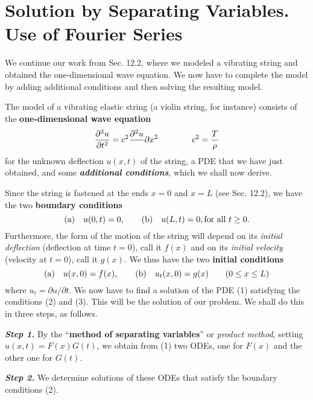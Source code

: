\documentclass[12pt, leqno, oneside]{amsart}
\begin{document}
\section{Solution by Separating Variables.\\
Use of Fourier Series}

We continue our work from Sec. 12.2, where we modeled a vibrating string and 
obtained the one-dimensional wave equation. We now have to complete the model 
by adding additional conditions and then solving the resulting model.

The model of a vibrating elastic string (a violin string, for instance)
consists of the \textbf{one-dimensional wave equation}
\begin{equation}
    \frac{\partial^2{u}}{\partial{t^2}} = c^2\frac{\partial^2{u}}\\
        {\partial{x^2}} \qquad \qquad c^2 = \frac{T}{\rho}
\end{equation}
for the unknown deflection $u(x,t)$ of the string, a PDE that we have just 
obtained, and some \textbf{\emph{additional conditions}}, which we shall now 
derive.

Since the string is fastened at the ends $x=0$ and $x=L$ (see Sec. 12.2), we 
have the two \textbf{boundary conditions}
\begin{equation}
    \text{(a)} \quad u(0,t) = 0, \qquad \text{(b)} \quad u(L,t) = 0, \qquad \\
        \text{for all } t \geq 0.
\end{equation}
Furthermore, the form of the motion of the string will depend on its
\emph{initial deflection} (deflection at time $t=0$), call it $f(x)$ and on 
its \emph{initial velocity} (velocity at $t=0$), call it $g(x)$.
We thus have the two \textbf{initial conditions}
\begin{equation}
    \text{(a)} \quad u(x,0) = f(x), \qquad \text{(b)} \quad u_t(x,0) = g(x) \\
        \qquad (0 \leq x \leq L)
\end{equation}
where $u_t=\partial u/\partial t$. We now have to find a solution of the PDE 
(1) satisfying the conditions (2) and (3). This will be the solution of our 
problem. We shall do this in three steps, as follows.

\emph{\textbf{Step 1.}} By the “\textbf{method of separating variables}” or
\emph{product method}, setting $u(x,t)=F(x)G(t)$, we obtain from (1) two 
ODEs, one for $F(x)$ and the other one for $G(t)$.

\emph{\textbf{Step 2.}} We determine solutions of these ODEs that satisfy 
the boundary conditions (2).
\end{document}
